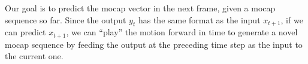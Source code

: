 \documentclass[10pt,twocolumn,letterpaper]{article}
\begin{document}

Our goal is to predict the mocap vector in the next frame, given a mocap sequence so far. Since the output $y_{t}$ has the same format as  the input $x_{t+1}$, if we can predict $x_{t+1}$, we can ``play'' the motion forward in time to generate a novel mocap sequence by feeding the output at the preceding time step as the input to the current one.
\end{document}
